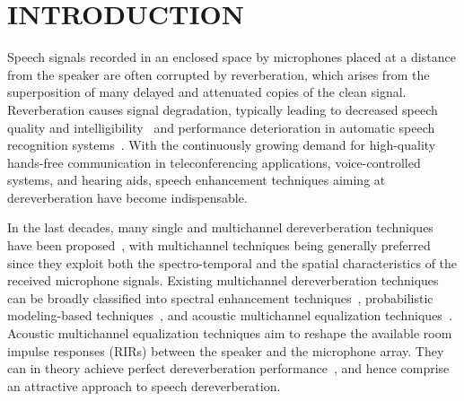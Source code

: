 \documentclass[fleqn]{aes2e}
\begin{document}
\maketitle

\section{INTRODUCTION}
Speech signals recorded in an enclosed space by microphones placed at a distance from the speaker are often corrupted by reverberation, which arises from the superposition of many delayed and attenuated copies of the clean signal.
Reverberation causes signal degradation, typically leading to decreased speech quality and intelligibility~\cite{Beutelmann_2006,Warzybok_IWAENC_2014,Goetze_JAES_2014} and performance deterioration in automatic speech recognition systems~\cite{Yoshioka_ISPM_2012,Xiong_EURASIP_2015}.
With the continuously growing demand for high-quality hands-free communication in teleconferencing applications, voice-controlled systems, and hearing aids, speech enhancement techniques aiming at dereverberation have become indispensable. 

In the last decades, many single and multichannel dereverberation techniques have been proposed~\cite{Naylor_Derev_book}, with multichannel techniques being generally preferred since they exploit both the spectro-temporal and the spatial characteristics of the received microphone signals. 
Existing multichannel dereverberation techniques can be broadly classified into spectral enhancement techniques~\cite{Habets2009a,Kuklasinksi_ICASSP_2015}, probabilistic modeling-based techniques~\cite{Nakatani_ITASLP_2010,Jukic_ITASLP_2015}, and acoustic  multichannel equalization techniques~\cite{Miyoshi_ITASS_1988, Kallinger_ICASSP_2006, Lim_ITASLP_2014, Kodrasi_ITASLP_2013}.
Acoustic multichannel equalization techniques aim to reshape the available room impulse responses (RIRs) between the speaker and the microphone array.
They can in theory achieve perfect dereverberation performance~\cite{Miyoshi_ITASS_1988}, and hence comprise an attractive approach to speech dereverberation.
\end{document}
